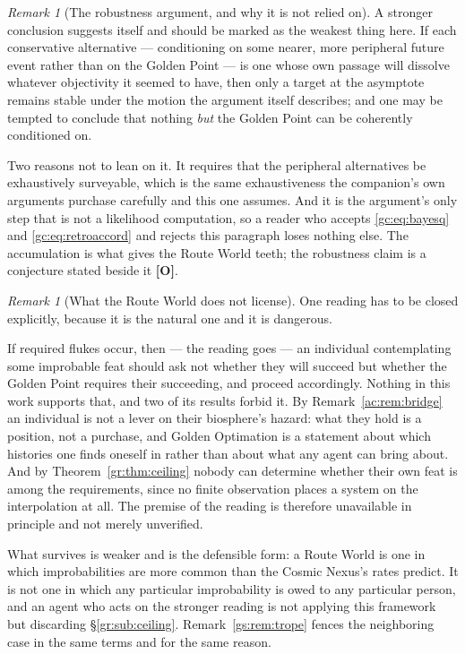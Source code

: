 \documentclass[11pt]{article}
\numberwithin{equation}{section}
\theoremstyle{plain}
\theoremstyle{definition}
\theoremstyle{remark}
\newtheorem{remark}[theorem]{Remark}
\begin{document}
\begin{remark}[The robustness argument, and why it is not relied on]
\label{gc:rem:routerobust}
A stronger conclusion suggests itself and should be marked as the
weakest thing here. If each conservative alternative --- conditioning on
some nearer, more peripheral future event rather than on the Golden
Point --- is one whose own passage will dissolve whatever objectivity it
seemed to have, then only a target at the asymptote remains stable under
the motion the argument itself describes; and one may be tempted to
conclude that nothing \emph{but} the Golden Point can be coherently
conditioned on.

Two reasons not to lean on it. It requires that the peripheral
alternatives be exhaustively surveyable, which is the same
exhaustiveness the companion's own arguments purchase carefully and this
one assumes. And it is the argument's only step that is not a
likelihood computation, so a reader who accepts \eqref{gc:eq:bayesq} and
\eqref{gc:eq:retroaccord} and rejects this paragraph loses nothing else.
The accumulation is what gives the Route World teeth; the robustness
claim is a conjecture stated beside it \textbf{[O]}.
\end{remark}

\begin{remark}[What the Route World does not license]
\label{gc:rem:routefence}
One reading has to be closed explicitly, because it is the natural one
and it is dangerous.

If required flukes occur, then --- the reading goes --- an individual
contemplating some improbable feat should ask not whether they will
succeed but whether the Golden Point requires their succeeding, and
proceed accordingly. Nothing in this work supports that, and two of its
results forbid it. By Remark~\ref{ac:rem:bridge} an individual is not a
lever on their biosphere's hazard: what they hold is a position, not a
purchase, and Golden Optimation is a statement about which histories one
finds oneself in rather than about what any agent can bring about. And
by Theorem~\ref{gr:thm:ceiling} nobody can determine whether their own
feat is among the requirements, since no finite observation places a
system on the interpolation at all. The premise of the reading is
therefore unavailable in principle and not merely unverified.

What survives is weaker and is the defensible form: a Route World is one in
which improbabilities are more common than the Cosmic Nexus's rates
predict. It is not one in which any particular improbability is owed to
any particular person, and an agent who acts on the stronger reading is
not applying this framework but discarding
\S\ref{gr:sub:ceiling}. Remark~\ref{gs:rem:trope} fences the neighboring
case in the same terms and for the same reason.
\end{remark}
\end{document}
